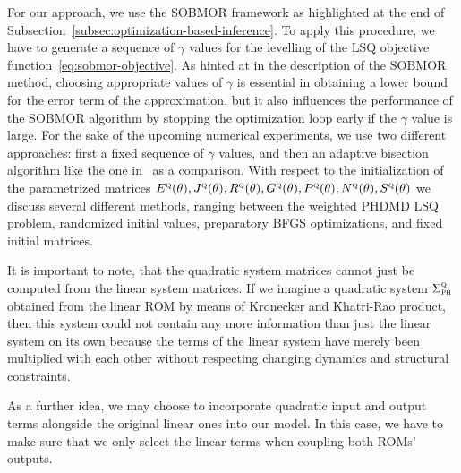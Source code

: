 For our approach, we use the \ac{SOBMOR} framework as highlighted at the end of Subsection~\ref{subsec:optimization-based-inference}.
To apply this procedure, we have to generate a sequence of $\gamma$ values for the levelling of the \ac{LSQ} objective function~\eqref{eq:sobmor-objective}.
As hinted at in the description of the \ac{SOBMOR} method, choosing appropriate values of $\gamma$ is essential in obtaining a lower bound for the error term of the approximation, but it also influences the performance of the \ac{SOBMOR} algorithm by stopping the optimization loop early if the $\gamma$ value is large.
For the sake of the upcoming numerical experiments, we use two different approaches: first a fixed sequence of $\gamma$ values, and then an adaptive bisection algorithm like the one in~\cite{SV2021} as a comparison.
With respect to the initialization of the parametrized matrices $E^{\textnormal{\scshape q}}(\theta), J^{\textnormal{\scshape q}}(\theta), R^{\textnormal{\scshape q}}(\theta), G^{\textnormal{\scshape q}}(\theta), P^{\textnormal{\scshape q}}(\theta), N^{\textnormal{\scshape q}}(\theta), S^{\textnormal{\scshape q}}(\theta)$ we discuss several different methods, ranging between the weighted \ac{PHDMD} \ac{LSQ} problem, randomized initial values, preparatory \ac{BFGS} optimizations, and fixed initial matrices.

It is important to note, that the quadratic system matrices cannot just be computed from the linear system matrices.
If we imagine a quadratic system $\Sigma_{\textnormal{\scshape ph}}^{\textnormal{\scshape q}}$ obtained from the linear \ac{ROM} by means of Kronecker and Khatri-Rao product, then this system could not contain any more information than just the linear system on its own because the terms of the linear system have merely been multiplied with each other without respecting changing dynamics and structural constraints.

As a further idea, we may choose to incorporate quadratic input and output terms alongside the original linear ones into our model.
In this case, we have to make sure that we only select the linear terms when coupling both \acp{ROM}' outputs.

